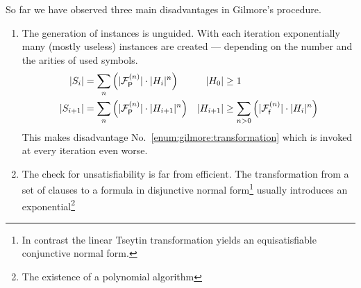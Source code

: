 So far we have observed three main disadvantages in Gilmore's procedure.
\begin{enumerate}
	\item\label{enum:gilmore:generation}
	The generation of instances is unguided.
	With each iteration exponentially many (mostly useless)
	instances are created
	--- depending on the number and the arities of used symbols.
	\begin{align*}
	\lvert S_{i} \rvert &= \sum_n \left( \lvert {\mathcal{F}^{(n)}_{\mathsf{P}}} \rvert\cdot \lvert H_{i}\rvert^n \right)
	&
	\lvert H_0 \rvert &\geq 1
	\\
	\lvert S_{i+1} \rvert &= \sum_n \left( \lvert {\mathcal{F}^{(n)}_{\mathsf{P}}} \rvert\cdot \lvert H_{i+1}\rvert^n \right)
	&
	\lvert H_{i+1}\rvert &\geq
	\sum_{n>0}\left(
	\lvert{\mathcal{F}^{(n)}_{\mathsf{f}}}\rvert\cdot\lvert H_i \rvert^n
	\right)
	\end{align*}
	This makes disadvantage No.~\ref{enum:gilmore:transformation}
	which is invoked at every iteration even worse.
	\item\label{enum:gilmore:transformation}
	The check for unsatisfiability is far from efficient.
	The transformation from a set of clauses
	to a formula in disjunctive normal form\footnote{
		In contrast the linear Tseytin transformation yields an equisatisfiable conjunctive normal form.
	}
	usually introduces an exponential\footnote{
		The existence of a polynomial algorithm
}
\end{enumerate}
